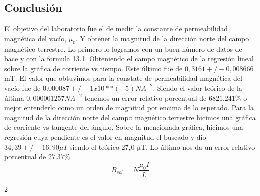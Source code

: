 \documentclass[12pt]{exam}
\begin{document}
\begin{multicols}{2}
\section{Conclusión}
El objetivo del laboratorio fue el de medir la constante de permeabilidad magnética del vacío,
 $\mu_0$. Y obtener la magnitud de la dirección norte del campo magnético terrestre. Lo primero
  lo logramos con un buen número de datos de bace y con la formula 13.1. Obteniendo el campo 
  magnético de la regresión lineal sobre la gráfica de corriente vs tiempo. 
  Este último fue de $0,3161 +/- 0,008666$ mT. El valor que obtuvimos para la constate de permeabilidad 
  magnética del vacío fue de $0.000087 +/- 1x10**(-5) NA^{-2}$. Siendo el valor teórico de la última $0,000001257 NA^{-2}$ 
  tenemos un error relativo porcentual de $6821.241\%$ o mejor entenderlo como un orden de magnitud por encima de lo esperado.
Para la magnitud de la dirección norte del campo magnético terrestre hicimos una gráfica de corriente vs tangente del ángulo. 
Sobre la mencionada gráfica, hicimos una regresión cuya pendiente es el valor en magnitud el buscado y dio $34,39 +/- 16,90 \mu T$ siendo el teórico 
27,0 µT. Lo último nos da un error relativo porcentual de $27.37 \%$.
$$B_{sol} = N \frac{\mu_0 I}{L}$$
\end{multicols}2
\end{document}

